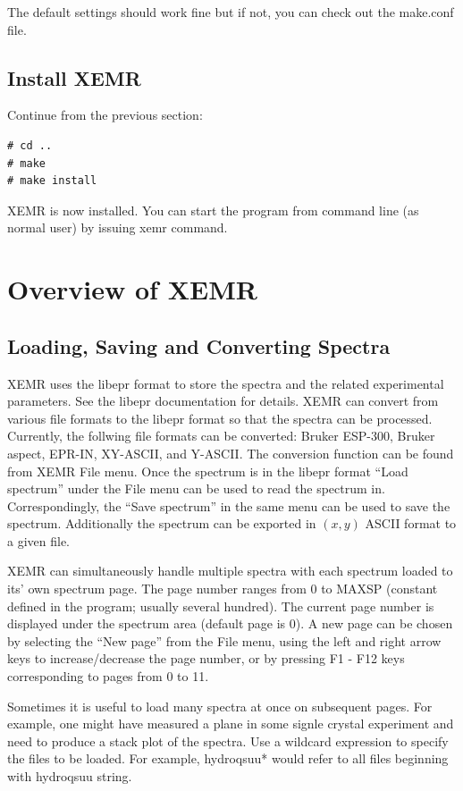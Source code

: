 \documentclass[byrevtex,amssymb,aps,pra,floatfix,letterpaper]{revtex4}
\begin{document}
\noindent
The default settings should work fine but if not, you can check out the make.conf file.

\subsection{Install XEMR}

Continue from the previous section:

\begin{verbatim}
# cd ..
# make
# make install
\end{verbatim}

\noindent
XEMR is now installed. You can start the program from command line (as normal user) by issuing xemr command.

\section{Overview of XEMR}

\subsection{Loading, Saving and Converting Spectra}

XEMR uses the libepr format to store the spectra and the related experimental parameters. See the libepr documentation for details. XEMR can convert from various file formats to the libepr format so that the spectra can be processed. Currently, the follwing file formats can be converted: Bruker ESP-300, Bruker aspect, EPR-IN, XY-ASCII, and Y-ASCII. The conversion function can be found from XEMR File menu. Once the spectrum is in the libepr format ``Load spectrum'' under the File menu can be used to read the spectrum in. Correspondingly, the ``Save spectrum'' in the same menu can be used to save the spectrum. Additionally the spectrum can be exported in $(x,y)$ ASCII format to a given file.

XEMR can simultaneously handle multiple spectra with each spectrum loaded to its' own spectrum page. The page number ranges from 0 to MAXSP (constant defined in the program; usually several hundred). The current page number is displayed under the spectrum area (default page is 0). A new page can be chosen by selecting the ``New page'' from the File menu, using the left and right arrow keys to increase/decrease the page number, or by pressing F1 - F12 keys corresponding to pages from 0 to 11.

Sometimes it is useful to load many spectra at once on subsequent pages. For example, one might have measured a plane in some signle crystal experiment and need to produce a stack plot of the spectra. Use a wildcard expression to specify the files to be loaded. For example, hydroqsuu* would refer to all files
beginning with hydroqsuu string.
\end{document}
